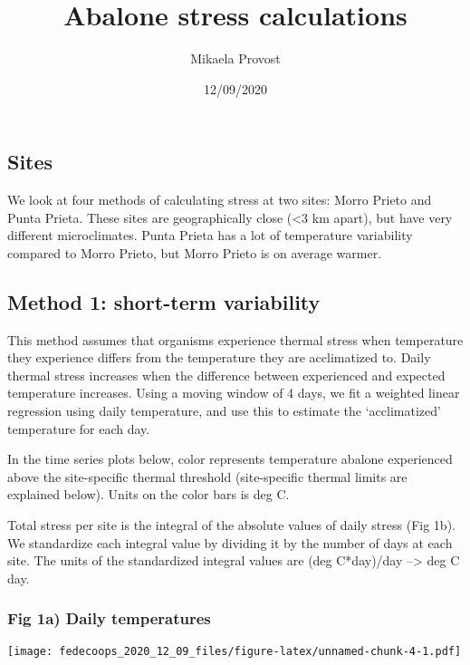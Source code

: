 \documentclass[]{article}
\title{Abalone stress calculations}
\author{Mikaela Provost}
\date{12/09/2020}
\begin{document}
\maketitle

\hypertarget{sites}{%
\subsection{Sites}\label{sites}}

We look at four methods of calculating stress at two sites: Morro Prieto
and Punta Prieta. These sites are geographically close (\textless3 km
apart), but have very different microclimates. Punta Prieta has a lot of
temperature variability compared to Morro Prieto, but Morro Prieto is on
average warmer.

\hypertarget{method-1-short-term-variability}{%
\subsection{Method 1: short-term
variability}\label{method-1-short-term-variability}}

This method assumes that organisms experience thermal stress when
temperature they experience differs from the temperature they are
acclimatized to. Daily thermal stress increases when the difference
between experienced and expected temperature increases. Using a moving
window of 4 days, we fit a weighted linear regression using daily
temperature, and use this to estimate the `acclimatized' temperature for
each day.

In the time series plots below, color represents temperature abalone
experienced above the site-specific thermal threshold (site-specific
thermal limits are explained below). Units on the color bars is deg C.

Total stress per site is the integral of the absolute values of daily
stress (Fig 1b). We standardize each integral value by dividing it by
the number of days at each site. The units of the standardized integral
values are (deg C*day)/day --\textgreater{} deg C day.

\hypertarget{fig-1a-daily-temperatures}{%
\subsubsection{Fig 1a) Daily
temperatures}\label{fig-1a-daily-temperatures}}

\texttt{[image: fedecoops\_2020\_12\_09\_files/figure-latex/unnamed-chunk-4-1.pdf]}
\end{document}
